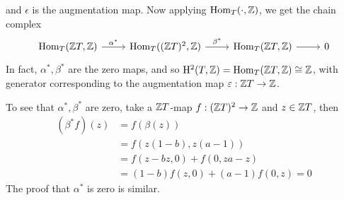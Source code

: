 \documentclass{article}
\begin{document}
\begin{example}
    and \(\epsilon\) is the augmentation map. Now applying \(\operatorname{Hom}_T(\cdot, \mathbb{Z})\), we get the chain complex
    \[\begin{tikzcd}
        {\Hom_T(\Z T, \Z)} & {\Hom_T((\Z T)^2, \Z)} & {\Hom_T(\Z T, \Z)} & 0
        \arrow["{\alpha^*}", from=1-1, to=1-2]
        \arrow["{\beta^*}", from=1-2, to=1-3]
        \arrow[from=1-3, to=1-4]
    \end{tikzcd}\]
    In fact, \(\alpha^*, \beta^*\) are the zero maps, and so \(\mathrm{H}^2(T, \mathbb{Z}) = \operatorname{Hom}_T(\mathbb{Z} T, \mathbb{Z}) \cong \mathbb{Z}\), with generator corresponding to the augmentation map \(\varepsilon : \mathbb{Z} T \to \mathbb{Z}\).

    To see that \(\alpha^*, \beta^*\) are zero, take a \(\mathbb{Z} T\)-map \(f : (\mathbb{Z} T)^2 \to \mathbb{Z}\) and \(z \in \mathbb{Z} T\), then
    \begin{align*}
        (\beta^*f)(z) &= f(\beta(z)) \\
        &= f(z(1 - b), z( a - 1)) \\
        &= f(z - bz, 0) + f(0, za - z) \\
        &= (1 - b)f(z, 0) + (a - 1)f(0, z) = 0
    \end{align*}
    The proof that \(\alpha^*\) is zero is similar.


\end{example}
\end{document}
